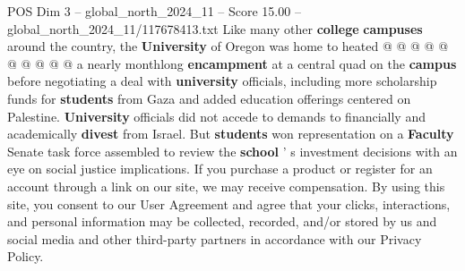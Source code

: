 \begin{textsample}{POS Dim 3 – global\_north\_2024\_11 – Score 15.00 – global\_north\_2024\_11/117678413.txt}
Like many other \textbf{college} \textbf{campuses} around the country, the \textbf{University} of Oregon was home to heated @ @ @ @ @ @ @ @ @ @ a nearly monthlong \textbf{encampment} at a central quad on the \textbf{campus} before negotiating a deal with \textbf{university} officials, including more scholarship funds for \textbf{students} from Gaza and added education offerings centered on Palestine. \textbf{University} officials did not accede to demands to financially and academically \textbf{divest} from Israel.
But \textbf{students} won representation on a \textbf{Faculty} Senate task force assembled to review the \textbf{school} ' s investment decisions with an eye on social justice implications.
If you purchase a product or register for an account through a link on our site, we may receive compensation.
By using this site, you consent to our User Agreement and agree that your clicks, interactions, and personal information may be collected, recorded, and/or stored by us and social media and other third-party partners in accordance with our Privacy Policy.

\end{textsample}

